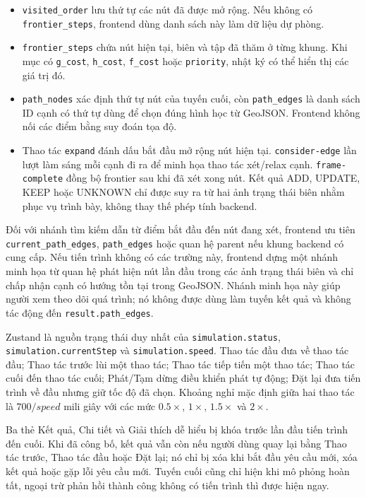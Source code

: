 \begin{itemize}[itemsep=3pt]
  \item \texttt{visited\_order} lưu thứ tự các nút đã được mở rộng. Nếu không
  có \texttt{frontier\_steps}, frontend dùng danh sách này làm dữ liệu dự phòng.
  \item \texttt{frontier\_steps} chứa nút hiện tại, biên và tập đã thăm ở
  từng khung. Khi mục có \texttt{g\_cost}, \texttt{h\_cost},
  \texttt{f\_cost} hoặc \texttt{priority}, nhật ký có thể hiển thị các giá trị đó.
  \item \texttt{path\_nodes} xác định thứ tự nút của tuyến cuối, còn
  \texttt{path\_edges} là danh sách ID cạnh có thứ tự dùng để chọn đúng hình học
  từ GeoJSON. Frontend không nối các điểm bằng suy đoán tọa độ.
  \item Thao tác \texttt{expand} đánh dấu bắt đầu mở rộng nút hiện tại.
  \texttt{consider-edge} lần lượt làm sáng mỗi cạnh đi ra để minh họa thao tác
  xét/relax cạnh. \texttt{frame-complete} đồng bộ frontier sau khi đã xét xong
  nút. Kết quả ADD, UPDATE, KEEP hoặc UNKNOWN chỉ được suy ra từ hai ảnh trạng
  thái biên nhằm phục vụ trình bày, không thay thế phép tính backend.
\end{itemize}

Đối với nhánh tìm kiếm dẫn từ điểm bắt đầu đến nút đang xét, frontend ưu tiên
\texttt{current\_path\_edges}, \texttt{path\_edges} hoặc quan hệ parent nếu
khung backend có cung cấp. Nếu tiến trình không có các trường này, frontend dựng một
nhánh minh họa từ quan hệ phát hiện nút lần đầu trong các ảnh trạng thái biên và
chỉ chấp nhận cạnh có hướng tồn tại trong GeoJSON. Nhánh minh họa này giúp người
xem theo dõi quá trình; nó không được dùng làm tuyến kết quả và không tác động
đến \texttt{result.path\_edges}.

Zustand là nguồn trạng thái duy nhất của \texttt{simulation.status},
\texttt{simulation.currentStep} và \texttt{simulation.speed}. Thao tác đầu đưa
về thao tác đầu; Thao tác trước lùi một thao tác; Thao tác tiếp tiến một thao tác;
Thao tác cuối đến thao tác cuối; Phát/Tạm dừng điều khiển phát tự động; Đặt lại đưa
tiến trình về đầu nhưng giữ tốc độ đã chọn. Khoảng nghỉ mặc định giữa hai thao tác
là $700/\textit{speed}$ mili giây với các mức $0.5\times$, $1\times$,
$1.5\times$ và $2\times$.

Ba thẻ Kết quả, Chi tiết và Giải thích dễ hiểu bị khóa trước lần đầu
tiến trình đến cuối. Khi đã công bố, kết quả vẫn còn nếu người dùng quay lại bằng
Thao tác trước, Thao tác đầu hoặc Đặt lại; nó chỉ bị xóa khi bắt đầu yêu cầu mới,
xóa kết quả hoặc gặp lỗi yêu cầu mới. Tuyến cuối cũng chỉ hiện khi mô phỏng hoàn
tất, ngoại trừ phản hồi thành công không có tiến trình thì được hiện ngay.

